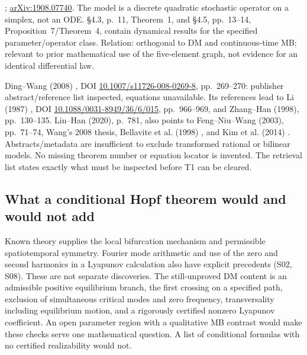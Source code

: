 \begin{description}[style=nextline,leftmargin=0pt,labelwidth=0pt,labelsep=0pt]
\item[S25: Ganikhodjaev, Pah and Rozikov (2019).]
\cite{GanikhodjaevPahRozikov2019};
\href{https://arxiv.org/pdf/1908.07740}{arXiv:1908.07740}.
The model is a discrete quadratic stochastic operator on a simplex,
not an ODE. \S4.3, p.~11, Theorem~1, and \S4.5,
pp.~13--14, Proposition~7/Theorem~4, contain dynamical results for
the specified parameter/operator class. Relation: orthogonal to DM
and continuous-time MB; relevant to prior mathematical use of the
five-element graph, not evidence for an identical differential law.

\item[S26--S29 and older Chinese sources: explicitly unresolved.]
Ding--Wang (2008) \cite{DingWang2008}, DOI
\href{https://doi.org/10.1007/s11726-008-0269-8}{10.1007/s11726-008-0269-8},
pp.~269--270: publisher abstract/reference list inspected, equations
unavailable. Its references lead to Li (1987)
\cite{Li1987}, DOI
\href{https://doi.org/10.1088/0031-8949/36/6/015}{10.1088/0031-8949/36/6/015},
pp.~966--969, and Zhang--Han (1998), pp.~130--135.
Lin--Han (2020), p.~781, also points to Feng--Niu--Wang (2003),
pp.~71--74, Wang's 2008 thesis, Bellavite et al. (1998)
\cite{BellaviteEtAl1998}, and Kim et al. (2014)
\cite{KimEtAl2014}. Abstracts/metadata are insufficient to exclude
transformed rational or bilinear models. No missing theorem number
or equation locator is invented. The retrieval list states exactly
what must be inspected before T1 can be cleared.
\end{description}

\subsection{What a conditional Hopf theorem would and would not add}
Known theory supplies the local bifurcation mechanism and permissible
spatiotemporal symmetry. Fourier mode arithmetic and use of the zero
and second harmonics in a Lyapunov calculation also have explicit
precedents (S02, S08). These are not separate discoveries.
The still-unproved DM content is an admissible positive equilibrium
branch, the first crossing on a specified path, exclusion of simultaneous
critical modes and zero frequency, transversality including equilibrium
motion, and a rigorously certified nonzero Lyapunov coefficient.
An open parameter region with a qualitative MB contrast would make these
checks serve one mathematical question. A list of conditional formulas
with no certified realizability would not.

